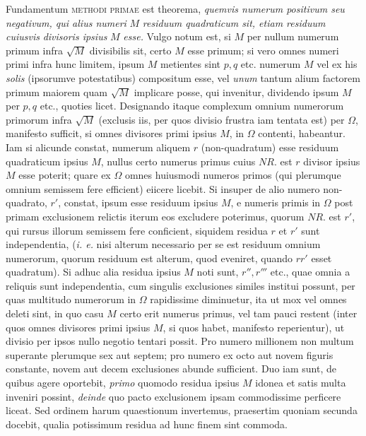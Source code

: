 Fundamentum \textsc{methodi primae} est theorema, \textit{quemvis numerum positivum seu} \textit{negativum, qui alius numeri} \(M\) \textit{residuum quadraticum sit, etiam residuum cuiusvis} \textit{divisoris ipsius} \(M\) \textit{esse.} Vulgo notum est, si \(M\) per nullum numerum primum infra \(\surd M\) divisibilis sit, certo \(M\) esse primum; si vero omnes numeri primi infra hunc limitem, ipsum \(M\) metientes sint \(p,\allowbreak q\) etc. numerum \(M\) vel ex his \textit{solis} (ipsorumve potestatibus) compositum esse, vel \textit{unum} tantum alium factorem primum maiorem quam \(\surd M\) implicare posse, qui invenitur, dividendo ipsum \(M\) per \(p,\allowbreak q\) etc., quoties licet. Designando itaque complexum omnium numerorum primorum infra \(\surd M\) (exclusis iis, per quos divisio frustra iam tentata est) per \(\Omega\), manifesto
sufficit, si omnes divisores primi ipsius \(M\), in \(\Omega\) contenti, habeantur. Iam si alicunde constat, numerum aliquem \(r\) (non-quadratum) esse residuum quadraticum ipsius \(M\), nullus certo numerus primus cuius \(NR.\) est \(r\) divisor ipsius \(M\) esse poterit; quare ex \(\Omega\) omnes huiusmodi numeros primos (qui plerumque omnium semissem fere efficient) eiicere licebit. Si insuper de alio numero non-quadrato, \(r'\), constat, ipsum esse residuum ipsius \(M\), e numeris primis in \(\Omega\) post primam exclusionem relictis iterum eos excludere poterimus, quorum \(NR.\) est \(r'\), qui rursus illorum semissem fere conficient, siquidem residua \(r\) et \(r'\) sunt independentia, (\textit{i. e.} nisi alterum necessario per se est residuum omnium numerorum, quorum residuum est alterum, quod eveniret, quando \(rr'\) esset quadratum). Si adhuc alia residua ipsius \(M\) noti sunt, \(r'',\allowbreak r'''\) etc., quae omnia a reliquis sunt independentia, cum singulis exclusiones similes institui possunt, per quas multitudo numerorum in \(\Omega\) rapidissime diminuetur, ita ut mox vel omnes deleti sint, in quo casu \(M\) certo erit numerus primus, vel tam pauci restent (inter quos omnes divisores primi ipsius \(M\), si quos habet, manifesto reperientur), ut divisio per ipsos nullo negotio tentari possit. Pro numero millionem non multum superante plerumque sex aut septem; pro numero ex octo aut novem figuris constante, novem aut decem exclusiones abunde sufficient. Duo iam sunt, de quibus agere oportebit, \textit{primo} quomodo residua ipsius \(M\) idonea et satis multa inveniri possint, \textit{deinde} quo pacto exclusionem ipsam commodissime perficere liceat. Sed ordinem harum quaestionum invertemus, praesertim quoniam secunda docebit, qualia potissimum residua ad hunc finem sint commoda.

